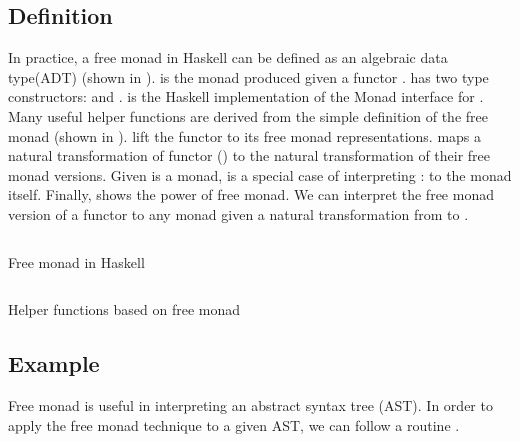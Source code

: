 \subsection{Definition}
In practice, a free monad in Haskell can be defined as an algebraic data type(ADT) (shown in ).  is the monad produced given a functor .  has two type constructors:  and .  is the Haskell implementation of the Monad interface for . Many useful helper functions are derived from the simple definition of the free monad (shown in ).  lift the functor to its free monad representations.  maps a natural transformation of functor () to the natural transformation of their free monad versions. Given  is a monad,  is a special case of interpreting : to the  monad itself. Finally,  shows the power of free monad. We can interpret the free monad version of a functor  to any monad  given a natural transformation from  to .
\begin{listing}[ht]
  \inputminted{haskell}{background/fm-construction.hs}
  \caption{Free monad in Haskell}
  \label{b:fm:c1}
\end{listing}
\begin{listing}[ht]
  \inputminted{haskell}{background/fm-helper.hs}
  \caption{Helper functions based on free monad}
  \label{b:fm:c2}
\end{listing}
\subsection{Example} \label{b:fm:e}

Free monad is useful in interpreting an abstract syntax tree (AST). In order to apply the free monad technique to a given AST, we can follow a routine \cite{contributorsCatsFreeMonadsa}.

